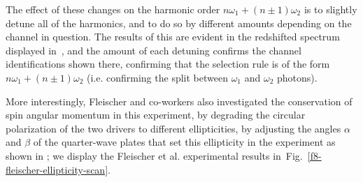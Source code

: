 The effect of these changes on the harmonic order $n\omega_1+(n\pm 1)\omega_2$ is to slightly detune all of the harmonics, and to do so by different amounts depending on the channel in question. The results of this are evident in the redshifted spectrum displayed in~, and the amount of each detuning confirms the channel identifications shown there, confirming that the selection rule is of the form $n\omega_1+(n\pm 1)\omega_2$ (i.e. confirming the split between $\omega_1$ and $\omega_2$ photons).



More interestingly, Fleischer and co-workers also investigated the conservation of spin angular momentum in this experiment, by degrading the circular polarization of the two drivers to different ellipticities, by adjusting the angles $\alpha$ and $\beta$ of the quarter-wave plates that set this ellipticity in the experiment as shown in ; we display the Fleischer et al. experimental results in~Fig.~\ref{f8-fleischer-ellipticity-scan}.%



